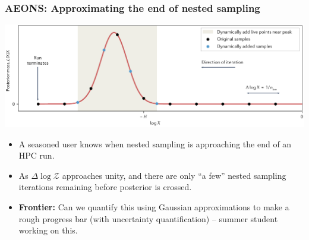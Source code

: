 \documentclass[aspectratio=169]{beamer}
\begin{document}
\begin{frame}
    \frametitle{AEONS: Approximating the end of nested sampling}
    \includegraphics[width=\textwidth]{figures/run_prodecure}
    \vspace{-20pt}
    \begin{itemize}
        \item A seasoned user knows when nested sampling is approaching the end of an HPC run.
        \item As $\Delta\log \mathcal{Z}$ approaches unity, and there are only ``a few'' nested sampling iterations remaining before posterior is crossed.
        \item \textbf{Frontier:} Can we quantify this using Gaussian approximations to make a rough progress bar (with uncertainty quantification) -- summer student working on this.
    \end{itemize}
\end{frame}
\end{document}
